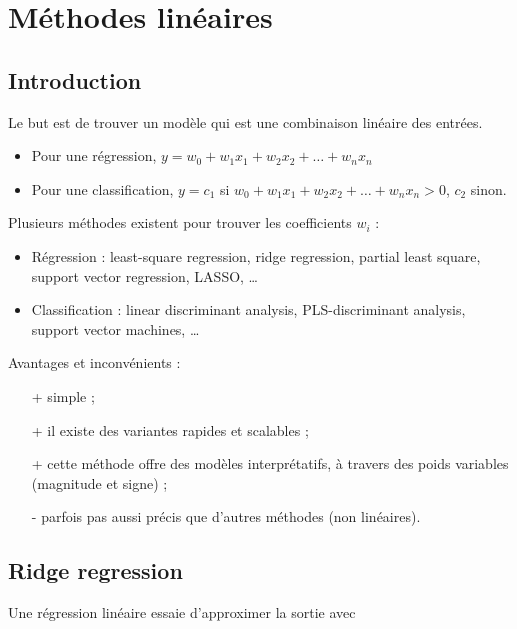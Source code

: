 \chapter{Méthodes linéaires}

	\section{Introduction}
	Le but est de trouver un modèle qui est une combinaison linéaire des entrées.

	\begin{itemize}
		\item Pour une régression, $y = w_0 + w_1 x_1 + w_2 x_2 + \dots + w_n x_n$
		\item Pour une classification, $y = c_1$ si $w_0 + w_1 x_1 + w_2 x_2 + \dots + w_n x_n > 0$, $c_2$ sinon.
	\end{itemize}


	Plusieurs méthodes existent pour trouver les coefficients $w_i$ : 

	\begin{itemize}
		\item Régression : least-square regression, ridge regression, partial least square, support vector regression, LASSO, \dots
		\item Classification : linear discriminant analysis, PLS-discriminant analysis, support vector machines, \dots \\
	\end{itemize} 

	Avantages et inconvénients :
	
	\begin{itemize}
		\item[+] simple ;
		\item[+] il existe des variantes rapides et scalables ;
		\item[+] cette méthode offre des modèles interprétatifs, à travers des poids variables (magnitude et signe) ;
		\item[-] parfois pas aussi précis que d'autres méthodes (non linéaires).
	\end{itemize}

	\section{Ridge regression}
	
	Une régression linéaire essaie d'approximer la sortie avec
	
